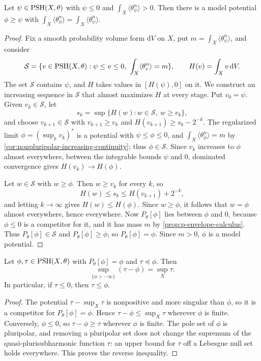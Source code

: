 \begin{lemma}\label{lem:mass-preserving-model-majorant}
Let $\psi\in\mathrm{PSH}(X,\theta)$ with $\psi\leq0$ and $\int_X\langle\theta_\psi^n\rangle>0$. Then there is a model potential $\phi\geq\psi$ with $\int_X\langle\theta_\phi^n\rangle=\int_X\langle\theta_\psi^n\rangle$.
\end{lemma}
\begin{proof}
Fix a smooth probability volume form $\mathrm dV$ on $X$, put $m=\int_X\langle\theta_\psi^n\rangle$, and consider
\[
 \mathcal S=\{v\in\PSH(X,\theta):\psi\leq v\leq0,
                                             \ \int_X\langle\theta_v^n\rangle=m\},
 \qquad H(v)=\int_Xv\,\mathrm dV.
\]
The set $\mathcal S$ contains $\psi$, and $H$ takes values in $[H(\psi),0]$ on it. We construct an increasing sequence in $\mathcal S$ that almost maximizes $H$ at every stage. Put $v_0=\psi$. Given $v_k\in\mathcal S$, let
\[
 s_k=\sup\{H(w):w\in\mathcal S,\ w\geq v_k\},
\]
and choose $v_{k+1}\in\mathcal S$ with $v_{k+1}\geq v_k$ and $H(v_{k+1})\geq s_k-2^{-k}$. The regularized limit $\phi=(\sup_kv_k)^*$ is a potential with $\psi\leq\phi\leq0$, and $\int_X\langle\theta_\phi^n\rangle=m$ by \cref{cor:nonpluripolar-increasing-continuity}; thus $\phi\in\mathcal S$. Since $v_k$ increases to $\phi$ almost everywhere, between the integrable bounds $\psi$ and $0$, dominated convergence gives $H(v_k)\to H(\phi)$.

Let $w\in\mathcal S$ with $w\geq\phi$. Then $w\geq v_k$ for every $k$, so
\[
 H(w)\leq s_k\leq H(v_{k+1})+2^{-k},
\]
and letting $k\to\infty$ gives $H(w)\leq H(\phi)$. Since $w\geq\phi$, it follows that $w=\phi$ almost everywhere, hence everywhere. Now $P_\theta[\phi]$ lies between $\phi$ and $0$, because $\phi\leq0$ is a competitor for it, and it has mass $m$ by \cref{prop:p-envelope-calculus}. Thus $P_\theta[\phi]\in\mathcal S$ and $P_\theta[\phi]\geq\phi$, so $P_\theta[\phi]=\phi$. Since $m>0$, $\phi$ is a model potential.
\end{proof}

\begin{lemma}\label{lem:model-normalized-supremum}
Let $\phi,\tau\in\mathrm{PSH}(X,\theta)$ with $P_\theta[\phi]=\phi$ and $\tau\preceq\phi$. Then
\[
 \sup_{\{\phi> -\infty\}}(\tau-\phi)=\sup_X\tau.
\]
In particular, if $\tau\leq0$, then $\tau\leq\phi$.
\end{lemma}
\begin{proof}
The potential $\tau-\sup_X\tau$ is nonpositive and more singular than $\phi$, so it is a competitor for $P_\theta[\phi]=\phi$. Hence $\tau-\phi\leq\sup_X\tau$ wherever $\phi$ is finite. Conversely, $\phi\leq0$, so $\tau-\phi\geq\tau$ wherever $\phi$ is finite. The pole set of $\phi$ is pluripolar, and removing a pluripolar set does not change the supremum of the quasi-plurisubharmonic function $\tau$: an upper bound for $\tau$ off a Lebesgue null set holds everywhere. This proves the reverse inequality.
\end{proof}

